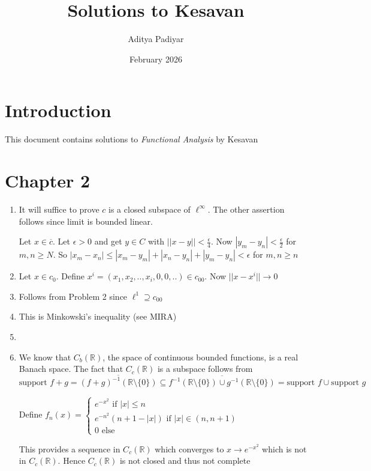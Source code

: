 \documentclass{article}
\title{Solutions to Kesavan}
\author{Aditya Padiyar}
\date{February 2026}
\begin{document}
\maketitle

\section{Introduction}
This document contains solutions to \textit{Functional Analysis} by Kesavan

\section*{Chapter 2}

\begin{enumerate}
    \item  It will suffice to prove $c$ is a closed subspace of $\ell^\infty$. The other assertion follows since limit is bounded linear.

    Let $x \in \overline{c}$. Let $\epsilon>0$ and get $y \in C$ with $||x-y||<\frac{\epsilon}{4}$. Now $|y_m-y_n|<\frac{\epsilon}{2}$ for $m,n \geq N$. So $|x_m-x_n|\leq|x_m-y_m|+|x_n-y_n|+|y_m-y_n|<\epsilon$ for $m,n \geq n$

    \item Let $x \in c_0$. Define $x^i=(x_1,x_2,..,x_i,0,0,..) \in c_{00}$. Now $||x-x^i||\to 0$
    \item Follows from Problem 2 since $\ell^1 \supseteq c_{00}$
    \item This is Minkowski's inequality (see MIRA)
    \item 
    \item We know that $C_b(\mathbb{R})$, the space of continuous bounded functions, is a real Banach space. The fact that $C_c(\mathbb{R})$ is a subspace follows from $\text{support }f+g=\overline{(f+g)^{-1}(\mathbb{R}\setminus\{0\} )} \subseteq \overline{f^{-1}(\mathbb{R}\setminus \{0\}) \cup g^{-1}(\mathbb{R}\setminus \{0\})}=\text{support }f \cup \text{support }g$

    Define $f_n(x)=\begin{cases}
        e^{-x^2} \text{ if } |x| \leq n \\
        e^{-n^2}(n+1-|x|) \text{ if } |x| \in (n,n+1) \\
        0 \text{ else}
    \end{cases}$

    This provides a sequence in $C_c(\mathbb{R})$ which converges to $x \to e^{-x^2}$ which is not in $C_c(\mathbb{R})$. Hence $C_c(\mathbb{R})$ is not closed and thus not complete


\end{enumerate}
\end{document}

